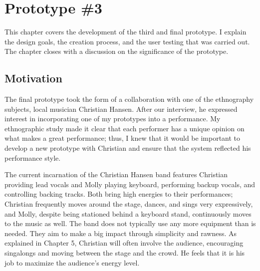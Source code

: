 









\section{Prototype \#3}

This chapter covers the development of the third and final prototype. I explain the design goals, the creation process, and the user testing that was carried out. The chapter closes with a discussion on the significance of the prototype.

\subsection{Motivation}

The final prototype took the form of a collaboration with one of the ethnography subjects, local musician Christian Hansen. After our interview, he expressed interest in incorporating one of my prototypes into a performance. My ethnographic study made it clear that each performer has a unique opinion on what makes a great performance; thus, I knew that it would be important to develop a new prototype with Christian and ensure that the system reflected his performance style.

The current incarnation of the Christian Hansen band features Christian providing lead vocals and Molly playing keyboard, performing backup vocals, and controlling backing tracks. Both bring high energies to their performances; Christian frequently moves around the stage, dances, and sings very expressively, and Molly, despite being stationed behind a keyboard stand, continuously moves to the music as well. The band does not typically use any more equipment than is needed. They aim to make a big impact through simplicity and rawness. As explained in Chapter 5, Christian will often involve the audience, encouraging singalongs and moving between the stage and the crowd. He feels that it is his job to maximize the audience's energy level.

